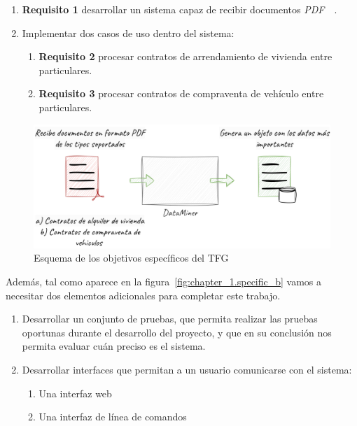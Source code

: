 \begin{enumerate}
    \item
    \textbf{Requisito 1} desarrollar un sistema capaz de recibir documentos
    \textit{PDF}~\cite{url_adobe_pdf}~\label{req:transform_pdf_to_text}.

    \item
    Implementar dos casos de uso dentro del sistema:
    \begin{enumerate}
        \item
        \textbf{Requisito 2} procesar contratos de arrendamiento de vivienda entre
        particulares\label{req:residence_lease_agreement}.

        \item
        \textbf{Requisito 3} procesar contratos de compraventa de vehículo entre
        particulares\label{req:sale_and_purchase_agreement}.
    \end{enumerate}
\end{enumerate}

\begin{figure}[ht]
    \begin{center}
        \includegraphics[width=\textwidth]{chapter/1/images/chapter_1.specific_a}
        \caption{Esquema de los objetivos específicos del TFG}
        \label{fig:chapter_1.specific_a}
    \end{center}
\end{figure}

Además, tal como aparece en la figura~\ref{fig:chapter_1.specific_b} vamos a necesitar dos elementos adicionales para
completar este trabajo.

\begin{enumerate}
    \item Desarrollar un conjunto de pruebas, que permita realizar las pruebas oportunas durante el desarrollo del
    proyecto, y que en su conclusión nos permita evaluar cuán preciso es el sistema.

    \item Desarrollar interfaces que permitan a un usuario comunicarse con el sistema:
    \begin{enumerate}
        \item  Una interfaz web
        \item  Una interfaz de línea de comandos
    \end{enumerate}
\end{enumerate}


